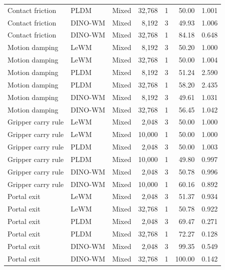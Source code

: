 \begin{longtable}{@{}p{2cm}lp{4cm}rrrr@{}}
Contact friction & PLDM & Mixed & 32,768 & 1 & 50.00 & 1.001 \\
Contact friction & DINO-WM & Mixed & 8,192 & 3 & 49.93 & 1.006 \\
Contact friction & DINO-WM & Mixed & 32,768 & 1 & 84.18 & 0.648 \\
Motion damping & LeWM & Mixed & 8,192 & 3 & 50.20 & 1.000 \\
Motion damping & LeWM & Mixed & 32,768 & 1 & 50.00 & 1.004 \\
Motion damping & PLDM & Mixed & 8,192 & 3 & 51.24 & 2.590 \\
Motion damping & PLDM & Mixed & 32,768 & 1 & 58.20 & 2.435 \\
Motion damping & DINO-WM & Mixed & 8,192 & 3 & 49.61 & 1.031 \\
Motion damping & DINO-WM & Mixed & 32,768 & 1 & 56.45 & 1.042 \\
Gripper carry rule & LeWM & Mixed & 2,048 & 3 & 50.00 & 1.000 \\
Gripper carry rule & LeWM & Mixed & 10,000 & 1 & 50.00 & 1.000 \\
Gripper carry rule & PLDM & Mixed & 2,048 & 3 & 50.00 & 1.003 \\
Gripper carry rule & PLDM & Mixed & 10,000 & 1 & 49.80 & 0.997 \\
Gripper carry rule & DINO-WM & Mixed & 2,048 & 3 & 50.78 & 0.996 \\
Gripper carry rule & DINO-WM & Mixed & 10,000 & 1 & 60.16 & 0.892 \\
Portal exit & LeWM & Mixed & 2,048 & 3 & 51.37 & 0.934 \\
Portal exit & LeWM & Mixed & 32,768 & 1 & 50.78 & 0.922 \\
Portal exit & PLDM & Mixed & 2,048 & 3 & 69.47 & 0.271 \\
Portal exit & PLDM & Mixed & 32,768 & 1 & 72.27 & 0.128 \\
Portal exit & DINO-WM & Mixed & 2,048 & 3 & 99.35 & 0.549 \\
Portal exit & DINO-WM & Mixed & 32,768 & 1 & 100.00 & 0.142 \\
\end{longtable}\endgroup
